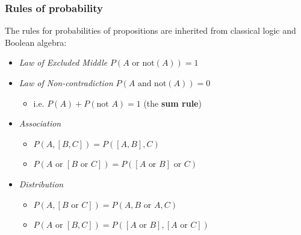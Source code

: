 \begin{frame}

\frametitle{Rules of probability}
\label{rulesofprobability}

The rules for probabilities of propositions are inherited from classical logic and Boolean algebra:

\begin{itemize}
\item \emph{Law of Excluded Middle} $P(A\text{ or not}(A)) = 1$

\item \emph{Law of Non-contradiction} $P(A\text{ and not}(A)) = 0$

\begin{itemize}
\item i.e. $P(A) + P(\text{not }A) = 1$ (the \textbf{sum rule})

\end{itemize}

\item \emph{Association}

\begin{itemize}
\item $P(A,[B,C]) = P([A,B],C)$

\item $P(A \text{ or } [B \text{ or }C]) = P([A \text{ or } B] \text{ or }C)$

\end{itemize}

\item \emph{Distribution}

\begin{itemize}
\item $P(A,[B\text{ or }C]) = P(A,B\text{ or }A,C)$

\item $P(A\text{ or }[B,C]) = P([A\text{ or }B],[A\text{ or }C])$

\end{itemize}

\end{itemize}

\end{frame}

